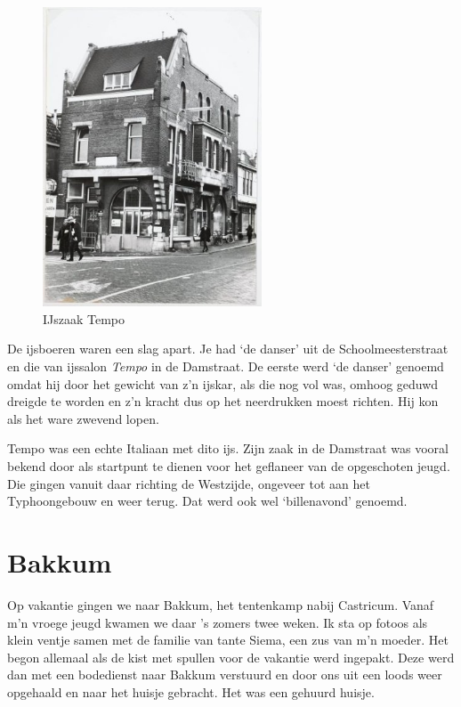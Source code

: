 \documentclass[12pt,twoside, openright]{memoir}
\begin{document}
\begin{figure}
\begin{center}
\includegraphics[width=0.58\textwidth]{img/66tempo}
\caption*{\footnotesize IJszaak Tempo}
\end{center}
\end{figure}

De ijsboeren waren een slag apart. Je had `de danser’ uit de Schoolmeesterstraat en die van ijssalon \emph{Tempo} in de Damstraat. De eerste werd `de danser' genoemd omdat hij door het gewicht van z’n ijskar, als die nog vol was, omhoog geduwd dreigde te worden en z’n kracht dus op het neerdrukken moest richten. Hij kon als het ware zwevend lopen. 

Tempo was een echte Italiaan met dito ijs. Zijn zaak in de Damstraat was vooral bekend door als startpunt te dienen voor het geflaneer van de opgeschoten jeugd.  Die gingen vanuit daar richting de Westzijde, ongeveer tot aan het Typhoongebouw en weer terug. Dat werd ook wel ‘billenavond’ genoemd. 

\section*{Bakkum} %
\label{cha:bakkum}

Op vakantie gingen we naar Bakkum, het tentenkamp nabij Castricum. Vanaf m’n vroege jeugd kwamen we daar ’s zomers twee weken. Ik sta op fotoos als klein ventje samen met de familie van tante Siema, een zus van m’n moeder. Het begon allemaal als de kist met spullen voor de vakantie werd ingepakt. Deze werd dan met een bodedienst naar Bakkum verstuurd en door ons uit een loods weer opgehaald en naar het huisje gebracht. Het was een gehuurd huisje. 
\end{document}
